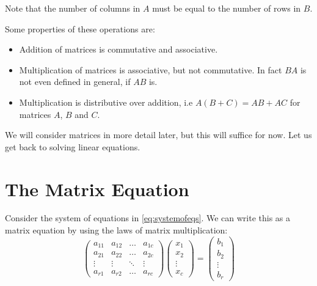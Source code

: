 Note that the number of columns in $A$ must be equal to the number of rows in $B$.

Some properties of these operations are:
\begin{itemize}
    \item Addition of matrices is commutative and associative.
    \item Multiplication of matrices is associative, but not commutative. In fact $BA$ is not
    even defined in general, if $AB$ is.
    \item Multiplication is distributive over addition, i.e $A(B + C) = AB + AC$ for matrices
    $A$, $B$ and $C$.
\end{itemize}

We will consider matrices in more detail later, but this will suffice for now. Let us get back
to solving linear equations.

\section{The Matrix Equation}
Consider the system of equations in \eqref{eq:systemofeqs}. We can write this as a matrix equation by
using the laws of matrix multiplication:
\begin{equation}
\begin{pmatrix}
	a_{11} & a_{12} & \dots & a_{1c} \\
	a_{21} & a_{22} & \dots & a_{2c} \\
	\vdots & \vdots & \ddots & \vdots \\
	a_{r1} & a_{r2} & \dots & a_{rc}
\end{pmatrix} \begin{pmatrix}
    x_1 \\
    x_2 \\
    \vdots \\
    x_c
\end{pmatrix} = \begin{pmatrix}
    b_1 \\
    b_2 \\
    \vdots \\
    b_r
\end{pmatrix}
\label{eq:matrixeq}
\end{equation}

